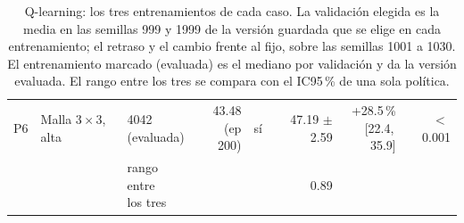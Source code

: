 \begin{table}[H]
\begin{tabular}{lllrlrrr}
P6 & \makecell[l]{Malla $3 \times 3$,\\{}alta} & \makecell[l]{4042\\{}(evaluada)} & \makecell[r]{43.48\\{}(ep 200)} & sí & \makecell[r]{47.19\\{}$\pm$ 2.59} & \makecell[r]{+28.5\,\%\\{}[22.4,\,35.9]} & $<$\,0.001 \\
 & & \makecell[l]{rango entre\\{}los tres} & & & 0.89 & & \\
\bottomrule
\end{tabular}
\caption[Entrenamientos de Q-learning]{Q-learning: los tres entrenamientos de cada caso. La validación elegida es la media en las semillas 999 y 1999 de la versión guardada que se elige en cada entrenamiento; el retraso y el cambio frente al fijo, sobre las semillas 1001 a 1030. El entrenamiento marcado (evaluada) es el mediano por validación y da la versión evaluada. El rango entre los tres se compara con el IC95\,\% de una sola política.}
\label{tab:veredicto-bases-ql}
\end{table}

